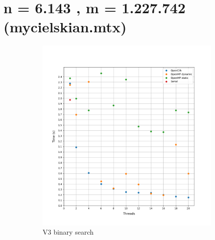 \documentclass[12pt, a4paper]{article}
\begin{document}
\section{n = 6.143 , m = 1.227.742 (mycielskian.mtx)}

\begin{figure}[h!]
     \begin{subfigure}[b]{0.33\textwidth}
         \centering
         \includegraphics[height=.4\textheight, width=\textwidth, keepaspectratio]{assets/mycielskian/v3.png}
    \caption{V3 binary search}
     \end{subfigure}
     \hfill
     \begin{subfigure}[b]{0.33\textwidth}
         \centering

\end{subfigure}
\end{figure}
\end{document}
